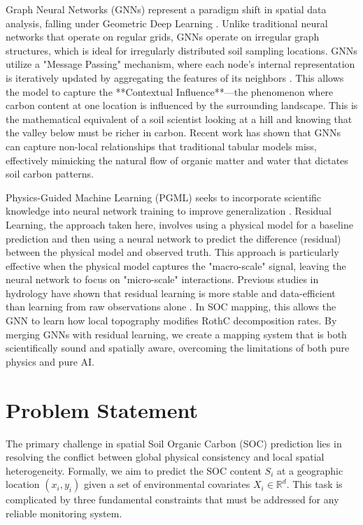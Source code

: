 \documentclass[conference]{IEEEtran}
\begin{document}
Graph Neural Networks (GNNs) represent a paradigm shift in spatial data analysis, falling under Geometric Deep Learning \cite{b9}. Unlike traditional neural networks that operate on regular grids, GNNs operate on irregular graph structures, which is ideal for irregularly distributed soil sampling locations. GNNs utilize a "Message Passing" mechanism, where each node's internal representation is iteratively updated by aggregating the features of its neighbors \cite{b4, b5}. This allows the model to capture the **Contextual Influence**—the phenomenon where carbon content at one location is influenced by the surrounding landscape. This is the mathematical equivalent of a soil scientist looking at a hill and knowing that the valley below must be richer in carbon. Recent work has shown that GNNs can capture non-local relationships that traditional tabular models miss, effectively mimicking the natural flow of organic matter and water that dictates soil carbon patterns.

Physics-Guided Machine Learning (PGML) seeks to incorporate scientific knowledge into neural network training to improve generalization \cite{b6}. Residual Learning, the approach taken here, involves using a physical model for a baseline prediction and then using a neural network to predict the difference (residual) between the physical model and observed truth. This approach is particularly effective when the physical model captures the "macro-scale" signal, leaving the neural network to focus on "micro-scale" interactions. Previous studies in hydrology have shown that residual learning is more stable and data-efficient than learning from raw observations alone \cite{b20}. In SOC mapping, this allows the GNN to learn how local topography modifies RothC decomposition rates. By merging GNNs with residual learning, we create a mapping system that is both scientifically sound and spatially aware, overcoming the limitations of both pure physics and pure AI.

\section{Problem Statement}

The primary challenge in spatial Soil Organic Carbon (SOC) prediction lies in resolving the conflict between global physical consistency and local spatial heterogeneity. Formally, we aim to predict the SOC content $S_i$ at a geographic location $(x_i, y_i)$ given a set of environmental covariates $X_i \in \mathbb{R}^d$. This task is complicated by three fundamental constraints that must be addressed for any reliable monitoring system.
\end{document}
